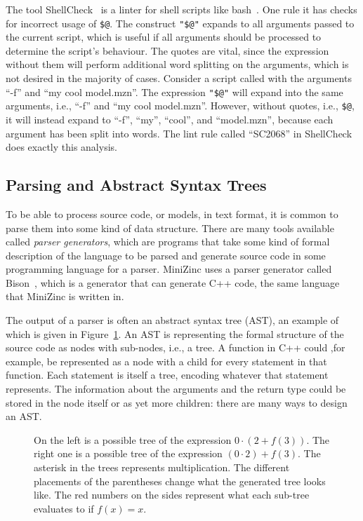 \documentclass[a4paper,12pt]{article}
\begin{document}
The tool ShellCheck~\cite{shellcheck} is a linter for shell scripts like
bash~\cite{bash}. One rule it has checks for incorrect usage of \texttt{\$@}.
The construct \texttt{"\$@"} expands to all arguments passed to the
current script, which is useful if all arguments should be processed to determine the script's
behaviour. The quotes are vital, since the expression without them will perform additional
word splitting on the arguments, which is not desired in the majority of cases. Consider a script called with the
arguments ``-f'' and ``my cool model.mzn''. The expression \texttt{"\$@"} will expand
into the same arguments, i.e., ``-f'' and ``my cool model.mzn''. However, without quotes, i.e.,
\texttt{\$@}, it will instead expand to ``-f'', ``my'', ``cool'', and ``model.mzn'', because each argument
has been split into words. The lint
rule called ``SC2068'' in ShellCheck does exactly this analysis.

\subsection{Parsing and Abstract Syntax Trees}\label{sec:parsing}
To be able to process source code, or models, in text format, it is common to parse them
into some kind of data structure. There are many tools available called \emph{parser
generators}, which are programs that take some kind of formal description of the
language to be parsed and generate source code in some programming language for a parser.
MiniZinc uses a parser generator called Bison~\cite{flexbison}, which is a generator that
can generate C++ code, the same language that MiniZinc is written in.

The output of a parser is often an abstract syntax tree (AST), an example of which is
given in Figure~\ref{fig:bkg:ast}. An AST is representing the formal structure of the
source code as nodes with sub-nodes, i.e., a tree. A function in C++ could
,for example, be represented as a node with a child for every statement in that function.
Each statement is itself a tree, encoding whatever that statement represents. The
information about the arguments and the return type could be stored in the node itself or
as yet more children: there are many ways to design an AST.

\begin{figure}[t]
  \centering
  
  \caption{On the left is a possible tree of the expression $0\cdot(2+f(3))$. The right one
    is a possible tree of the expression $(0 \cdot 2)+f(3)$. The asterisk in the trees
    represents multiplication. The different placements of the parentheses change what the
    generated tree looks like. The red numbers on the sides represent what each sub-tree
    evaluates to if $f(x) = x$.}%
  \label{fig:bkg:ast}
\end{figure}
\end{document}
